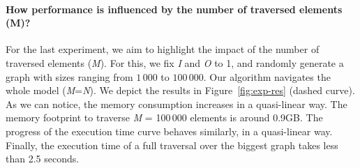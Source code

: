 
\paragraph{How performance is influenced by the number of traversed elements (M)?}%

For the last experiment, we aim to highlight the impact of the number of traversed elements (\textit{M}). For this, we fix \textit{I} and \textit{O} to 1, and randomly generate a graph with sizes ranging from $1\,000$ to $100\,000$. Our algorithm navigates the whole model (\textit{M}=\textit{N}).
We depict the results in Figure~\ref{fig:exp-res} (dashed curve).
As we can notice, the memory consumption increases in a quasi-linear way. The memory footprint to traverse \textit{M} = 100\,000 elements is around 0.9GB. The progress of the execution time curve behaves similarly, in a quasi-linear way. Finally, the execution time of a full traversal over the biggest graph takes less than 2.5 seconds. 

%

